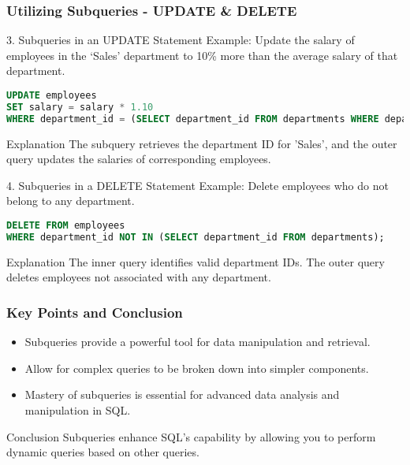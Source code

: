 \documentclass[aspectratio=169]{beamer}
\begin{document}
\begin{frame}[fragile]
    \frametitle{Utilizing Subqueries - UPDATE & DELETE}

    \begin{block}{3. Subqueries in an UPDATE Statement}
    Example: Update the salary of employees in the ‘Sales’ department to 10\% more than the average salary of that department.
    \begin{lstlisting}[language=SQL]
UPDATE employees 
SET salary = salary * 1.10 
WHERE department_id = (SELECT department_id FROM departments WHERE department_name = 'Sales');
    \end{lstlisting}
    \end{block}
    \begin{block}{Explanation}
    The subquery retrieves the department ID for 'Sales', and the outer query updates the salaries of corresponding employees.
    \end{block}

    \begin{block}{4. Subqueries in a DELETE Statement}
    Example: Delete employees who do not belong to any department.
    \begin{lstlisting}[language=SQL]
DELETE FROM employees 
WHERE department_id NOT IN (SELECT department_id FROM departments);
    \end{lstlisting}
    \end{block}
    \begin{block}{Explanation}
    The inner query identifies valid department IDs. The outer query deletes employees not associated with any department.
    \end{block}
\end{frame}

\begin{frame}[fragile]
    \frametitle{Key Points and Conclusion}
    \begin{itemize}
        \item Subqueries provide a powerful tool for data manipulation and retrieval.
        \item Allow for complex queries to be broken down into simpler components.
        \item Mastery of subqueries is essential for advanced data analysis and manipulation in SQL.
    \end{itemize}
    \begin{block}{Conclusion}
    Subqueries enhance SQL’s capability by allowing you to perform dynamic queries based on other queries.
    \end{block}
\end{frame}
\end{document}
